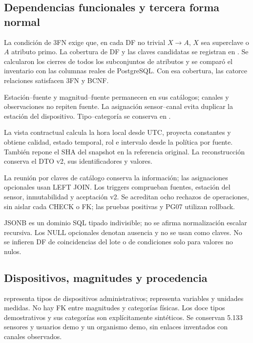 \subsection{Dependencias funcionales y tercera forma normal}
La condición de 3FN exige que, en cada DF no trivial \(X\to A\), \(X\) sea
superclave o \(A\) atributo primo. La cobertura de DF y las claves candidatas se
registran en . Se calcularon los
cierres de todos los subconjuntos de atributos y se comparó el inventario con
las columnas reales de PostgreSQL. Con esa cobertura, las catorce relaciones
satisfacen 3FN y BCNF.

Estación--fuente y magnitud--fuente permanecen en sus catálogos; canales y
observaciones no repiten fuente. La asignación sensor--canal evita duplicar la
estación del dispositivo. Tipo--categoría se conserva en .

La vista contractual calcula la hora local desde UTC, proyecta constantes y
obtiene calidad, estado temporal, rol e intervalo desde la política por fuente.
También repone el SHA del snapshot en la referencia original. La reconstrucción
conserva el DTO v2, sus identificadores y valores.

La reunión por claves de catálogo conserva la información; las asignaciones
opcionales usan LEFT JOIN. Los triggers comprueban fuentes, estación del sensor,
inmutabilidad y aceptación v2. Se acreditan ocho rechazos de operaciones, sin
aislar cada CHECK o FK; las pruebas positivas y PG07 utilizan rollback.

JSONB es un dominio SQL tipado indivisible; no se afirma normalización escalar
recursiva. Los NULL opcionales denotan ausencia y no se usan como claves. No se
infieren DF de coincidencias del lote o de condiciones solo para valores no nulos.

\subsection{Dispositivos, magnitudes y procedencia}
 representa tipos de dispositivos administrativos;
 representa variables y unidades medidas. No hay FK
entre magnitudes y categorías físicas. Los doce tipos demostrativos y sus
categorías son explícitamente sintéticos. Se conservan 5.133 sensores y usuarios
demo y un organismo demo, sin enlaces inventados con canales observados.

